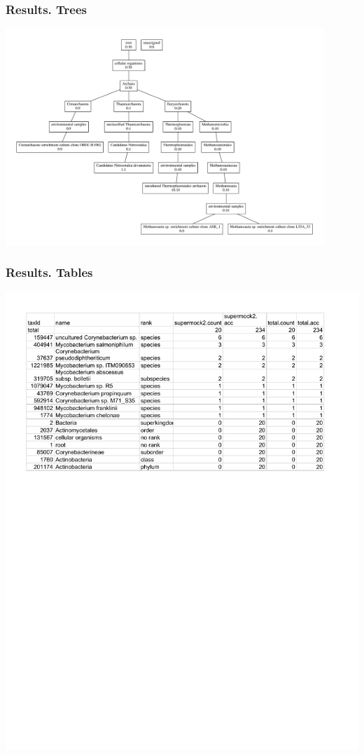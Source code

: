 \documentclass{beamer}
\begin{document}
\begin{frame}
\frametitle{Results. Trees}
\includegraphics[width=0.9\textwidth]{tree.pdf}
\end{frame}


\begin{frame}
\frametitle{Results. Tables}
\includegraphics[width=\textwidth]{table.pdf}
\end{frame}
\end{document}
